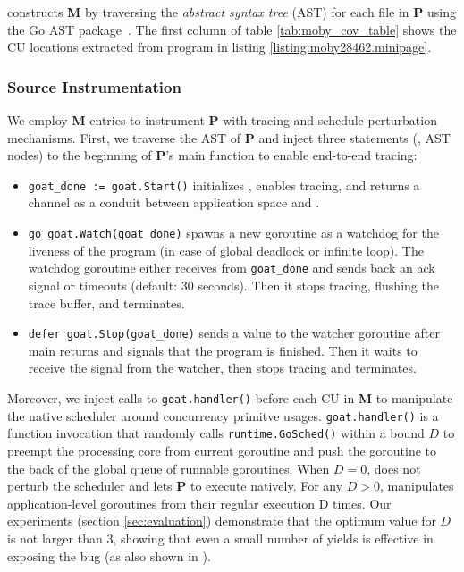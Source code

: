 \goat constructs \textbf{M} by traversing the \textit{abstract syntax tree} (AST) for each file in \textbf{P} using the Go AST package~\cite{go-package-ast}.
%
The first column of table \ref{tab:moby_cov_table} shows the CU locations extracted from program in listing \ref{listing:moby28462.minipage}.

\subsubsection{Source Instrumentation}

We employ \textbf{M} entries to instrument \textbf{P} with tracing and schedule perturbation mechanisms.
%
First, we traverse the AST of \textbf{P} and inject three statements (\ie, AST nodes) to the beginning of \textbf{P}'s main function to enable end-to-end tracing:
\begin{itemize}
  \item \texttt{goat\_done := goat.Start()} initializes \goat, enables tracing, and returns a channel as a conduit between application space and \goat.
  \item \texttt{go goat.Watch(goat\_done)} spawns a new goroutine as a watchdog for the liveness of the program (in case of global deadlock or infinite loop). The watchdog goroutine either receives from \texttt{goat\_done} and sends back an ack signal or timeouts (default: 30 seconds). Then it stops tracing, flushing the trace buffer, and terminates.
  \item \texttt{defer goat.Stop(goat\_done)} sends a value to the watcher goroutine after main returns and signals that the program is finished. Then it waits to receive the signal from the watcher, then stops tracing and terminates.
\end{itemize}

Moreover, we inject calls to \texttt{goat.handler()} before each CU in \textbf{M} to manipulate the native scheduler around concurrency primitve usages. \texttt{goat.handler()} is a function invocation that randomly calls \texttt{runtime.GoSched()} within a bound $D$ to preempt the processing core from current goroutine and push the goroutine to the back of the global queue of runnable goroutines.
%
When $D=0$, \goat does not perturb the scheduler and lets \textbf{P} to execute natively. For any $D>0$, \goat manipulates application-level goroutines from their regular execution D times.
%
Our experiments (section \ref{sec:evaluation}) demonstrate that the optimum value for $D$ is not larger than 3, showing that even a small number of yields is effective in exposing the bug (as also shown in \cite{burckhardt-depthBug-asplos10}).

